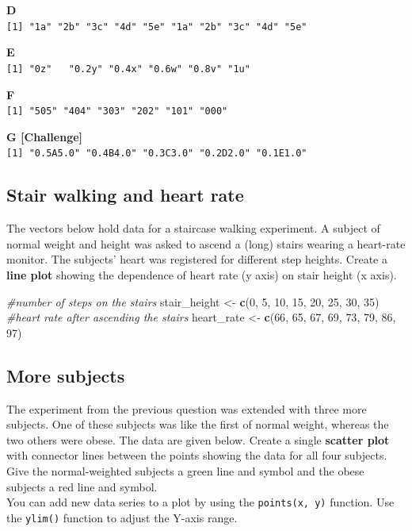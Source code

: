 \documentclass[]{book}
\newenvironment{Shaded}{\begin{snugshade}}{\end{snugshade}}
\newcommand{\CommentTok}[1]{\textcolor[rgb]{0.56,0.35,0.01}{\textit{#1}}}
\newcommand{\DecValTok}[1]{\textcolor[rgb]{0.00,0.00,0.81}{#1}}
\newcommand{\KeywordTok}[1]{\textcolor[rgb]{0.13,0.29,0.53}{\textbf{#1}}}
\newcommand{\NormalTok}[1]{#1}
\newcommand{\StringTok}[1]{\textcolor[rgb]{0.31,0.60,0.02}{#1}}
\begin{document}
\textbf{D}\\
\texttt{{[}1{]}\ "1a"\ "2b"\ "3c"\ "4d"\ "5e"\ "1a"\ "2b"\ "3c"\ "4d"\ "5e"}

\textbf{E}\\
\texttt{{[}1{]}\ "0z"\ \ \ "0.2y"\ "0.4x"\ "0.6w"\ "0.8v"\ "1u"}

\textbf{F}\\
\texttt{{[}1{]}\ "505"\ "404"\ "303"\ "202"\ "101"\ "000"}

\textbf{G {[}Challenge{]}}\\
\texttt{{[}1{]}\ "0.5A5.0"\ "0.4B4.0"\ "0.3C3.0"\ "0.2D2.0"\ "0.1E1.0"}

\hypertarget{stair-walking-and-heart-rate}{%
\subsection{Stair walking and heart rate}\label{stair-walking-and-heart-rate}}

The vectors below hold data for a staircase walking experiment. A subject of normal weight and height was asked to ascend a (long) stairs wearing a heart-rate monitor. The subjects' heart was registered for different step heights. Create a \textbf{line plot} showing the dependence of heart rate (y axis) on stair height (x axis).

\begin{Shaded}
\begin{Highlighting}[]
\CommentTok{#number of steps on the stairs}
\NormalTok{stair_height <-}\StringTok{ }\KeywordTok{c}\NormalTok{(}\DecValTok{0}\NormalTok{, }\DecValTok{5}\NormalTok{, }\DecValTok{10}\NormalTok{, }\DecValTok{15}\NormalTok{, }\DecValTok{20}\NormalTok{, }\DecValTok{25}\NormalTok{, }\DecValTok{30}\NormalTok{, }\DecValTok{35}\NormalTok{)}
\CommentTok{#heart rate after ascending the stairs}
\NormalTok{heart_rate <-}\StringTok{ }\KeywordTok{c}\NormalTok{(}\DecValTok{66}\NormalTok{, }\DecValTok{65}\NormalTok{, }\DecValTok{67}\NormalTok{, }\DecValTok{69}\NormalTok{, }\DecValTok{73}\NormalTok{, }\DecValTok{79}\NormalTok{, }\DecValTok{86}\NormalTok{, }\DecValTok{97}\NormalTok{)}
\end{Highlighting}
\end{Shaded}

\hypertarget{more-subjects}{%
\subsection{More subjects}\label{more-subjects}}

The experiment from the previous question was extended with three more subjects. One of these subjects was like the first of normal weight, whereas the two others were obese. The data are given below. Create a single \textbf{scatter plot} with connector lines between the points showing the data for all four subjects. Give the normal-weighted subjects a green line and symbol and the obese subjects a red line and symbol.\\
You can add new data series to a plot by using the \texttt{points(x,\ y)} function. Use the \texttt{ylim()} function to adjust the Y-axis range.
\end{document}
